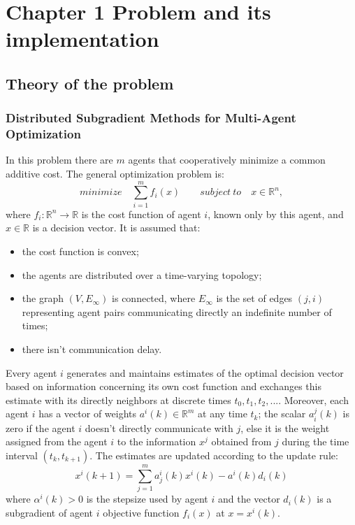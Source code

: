 \documentclass[a4paper,11pt,oneside]{book}
\begin{document}
\chapter{Chapter 1 Problem and its implementation} \label{Cap1}

\section{Theory of the problem} \label{Sec1.1}
\subsection {Distributed Subgradient Methods for Multi-Agent Optimization} \label{Subsec1.1.1}
In this problem there are $m$ agents that cooperatively minimize a common additive cost. The general optimization problem is:\\
\begin{equation} \label{costfunct}
minimize \quad \sum\limits_{i=1}^{m} f_{i} \left( x \right) \qquad subject \ to \quad x \in \mathbb{R}^n,
\end{equation}
where $f_i : \mathbb{R}^n \longrightarrow \mathbb{R}$ is the cost function of agent $i$, known only by this agent, and $x \in \mathbb{R}$ is a decision vector. It is assumed that:
\begin{itemize} 
\item the cost function is convex;
\item the agents are distributed over a time-varying topology;
\item the graph $\left(V,E_\infty\right)$ is connected, where $E_\infty$ is the set of edges $\left(j,i\right)$ representing agent pairs communicating directly an indefinite number of times;
\item there isn't communication delay.
\end{itemize} 
Every agent $i$ generates and maintains estimates of the optimal decision vector based on information concerning its own cost function and exchanges this estimate with its directly neighbors at discrete times $t_0, t_1, t_2, ...$. Moreover, each agent $i$ has a vector of weights $a^i(k) \in \mathbb{R}^m$ at any time $t_k$; the scalar $a_i^j(k)$ is zero if the agent $i$ doesn't directly communicate with $j$, else it is the weight assigned from the agent $i$ to the information $x^j$ obtained from $j$ during the time interval $(t_k,t_{k+1})$. The estimates are updated according to the update rule:
\begin{equation} \label{update}
x^i\left(k+1\right) = \sum_{j=1}^{m}{a_j^i\left(k\right)x^i\left(k\right)-a^i\left(k\right)d_i\left(k\right)}
\end{equation}
where $\alpha^i(k)>0$ is the stepsize used by agent $i$ and the vector $d_i(k)$ is a subgradient of agent $i$ objective function $f_i(x)$ at $x=x^i(k)$. \cite{CITATION:1}
\end{document}
